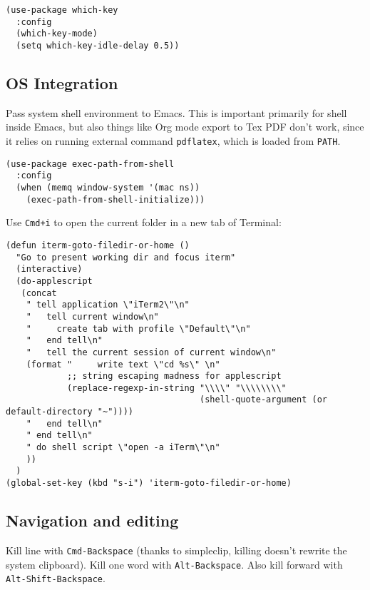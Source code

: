 \documentclass[11pt]{article}
\begin{document}
\begin{verbatim}
(use-package which-key
  :config
  (which-key-mode)
  (setq which-key-idle-delay 0.5))
\end{verbatim}

\subsection{OS Integration}
\label{sec:org32774d9}

Pass system shell environment to Emacs. This is important primarily for shell inside Emacs, but also things like Org mode export to Tex PDF don't work, since it relies on running external command \texttt{pdflatex}, which is loaded from \texttt{PATH}.

\begin{verbatim}
(use-package exec-path-from-shell
  :config
  (when (memq window-system '(mac ns))
    (exec-path-from-shell-initialize)))
\end{verbatim}

Use \texttt{Cmd+i} to open the current folder in a new tab of Terminal:

\begin{verbatim}
(defun iterm-goto-filedir-or-home ()
  "Go to present working dir and focus iterm"
  (interactive)
  (do-applescript
   (concat
    " tell application \"iTerm2\"\n"
    "   tell current window\n"
    "     create tab with profile \"Default\"\n"
    "   end tell\n"
    "   tell the current session of current window\n"
    (format "     write text \"cd %s\" \n"
            ;; string escaping madness for applescript
            (replace-regexp-in-string "\\\\" "\\\\\\\\"
                                      (shell-quote-argument (or default-directory "~"))))
    "   end tell\n"
    " end tell\n"
    " do shell script \"open -a iTerm\"\n"
    ))
  )
(global-set-key (kbd "s-i") 'iterm-goto-filedir-or-home)
\end{verbatim}

\subsection{Navigation and editing}
\label{sec:orgf68bf93}
Kill line with \texttt{Cmd-Backspace} (thanks to simpleclip, killing doesn't rewrite the system clipboard). Kill one word with \texttt{Alt-Backspace}. Also kill forward with \texttt{Alt-Shift-Backspace}.
\end{document}

